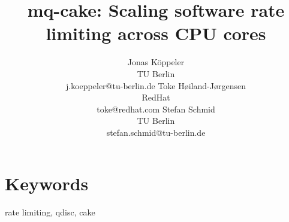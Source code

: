 \documentclass[letterpaper]{article}
\title{mq-cake: Scaling software rate limiting across CPU cores}
\author{Jonas Köppeler\\TU Berlin \\j.koeppeler@tu-berlin.de \And Toke H\o{}iland-J\o{}rgensen\\RedHat\\toke@redhat.com \And Stefan Schmid \\ TU Berlin\\stefan.schmid@tu-berlin.de
}
\begin{document}
\maketitle

\section{Keywords}
rate limiting, qdisc, cake









\balance

\end{document}
